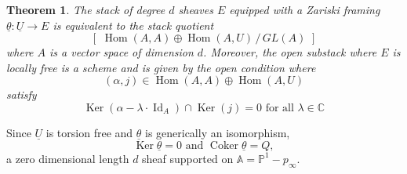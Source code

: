 \documentclass{amsart}
\newtheorem{theorem}{Theorem}[section]
\theoremstyle{definition}
\newcommand{\CC} {{\mathbb C}}          %
\renewcommand{\AA} {{\mathbb A}}
\newcommand{\PP}{\mathbb{P}}
\newcommand{\Hom}{\operatorname{Hom}}
\newcommand{\Ker}{\operatorname{Ker}}
\newcommand{\Coker}{\operatorname{Coker}}
\newcommand{\UL}[1]{\underline{#1}}
\newcommand{\Id}{\operatorname{Id}}
\begin{document}
\begin{theorem}\label{thm: stack of Zariski framed sheaves is
equivalent to stack of quiver representation}
The stack of degree $d$ sheaves $E$ equipped with a Zariski framing
$\UL{\theta}: \UL{U}\to E$ is equivalent to the stack quotient
\[
[\,\,\Hom (A,A)\oplus \Hom (A,U) \,/\, GL(A)\,\, ]
\]
where $A$ is a vector space of dimension $d$. Moreover, the open
substack where $E$ is locally free is a scheme and is given by the
open condition where 
\[
(\alpha ,j)\in \Hom (A,A)\oplus \Hom (A,U) 
\]
satisfy 
\begin{equation}\label{eqn: open condition involving ker j}
\Ker (\alpha -\lambda \cdot \Id_{A})\cap \Ker (j) = 0\text{ for all }\lambda \in \CC 
\end{equation}
\end{theorem}

\proof Since $\UL{U}$ is torsion free and $\UL{\theta}$ is generically
an isomorphism,
\[
\Ker \UL{\theta}=0\text{ and } \Coker \UL{\theta}=Q ,
\]
a zero dimensional length $d$ sheaf supported on $\AA=\PP^{1}-p_{\infty}$.
\end{document}
